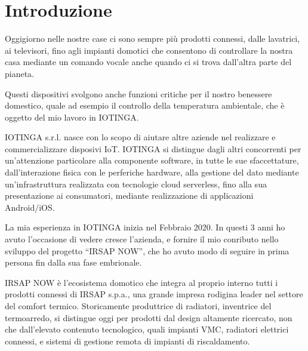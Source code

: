 \documentclass[12pt,a4paper,twoside,titlepage]{book}
\begin{document}
\begin{frontespizio}
\end{frontespizio}

\frontmatter

\tableofcontents

\mainmatter

\chapter{Introduzione}

Oggigiorno nelle nostre case ci sono sempre più prodotti connessi,
dalle lavatrici, ai televisori, fino agli impianti domotici che
consentono di controllare la nostra casa mediante un comando vocale
anche quando ci si trova dall'altra parte del pianeta.

Questi dispositivi svolgono anche funzioni critiche per il nostro
benessere domestico, quale ad esempio il controllo della temperatura
ambientale, che è oggetto del mio lavoro in IOTINGA.

IOTINGA s.r.l. nasce con lo scopo di aiutare altre aziende nel realizzare e
commercializzare disposivi IoT. IOTINGA si distingue dagli altri
concorrenti per un'attenzione particolare alla componente software,
in tutte le sue sfaccettature, dall'interazione fisica con le perferiche
hardware, alla gestione del dato mediante un'infrastruttura realizzata
con tecnologie cloud serverless, fino alla sua presentazione ai consumatori,
mediante realizzazione di applicazioni Android/iOS.

La mia esperienza in IOTINGA inizia nel Febbraio 2020. In questi 3 anni
ho avuto l'occasione di vedere cresce l'azienda, e fornire il mio conributo
nello sviluppo del progetto ``IRSAP NOW'', che ho avuto modo di seguire
in prima persona fin dalla sua fase embrionale.

IRSAP NOW è l'ecosistema domotico che integra al proprio interno tutti
i prodotti connessi di IRSAP s.p.a., una grande impresa rodigina leader
nel settore del comfort termico. Storicamente produttrice di radiatori,
inventrice del termoarredo, si distingue oggi per prodotti dal design altamente
ricercato, non che dall'elevato contenuto tecnologico, quali impianti VMC,
radiatori elettrici connessi, e sistemi di gestione remota di impianti di riscaldamento.
\end{document}
